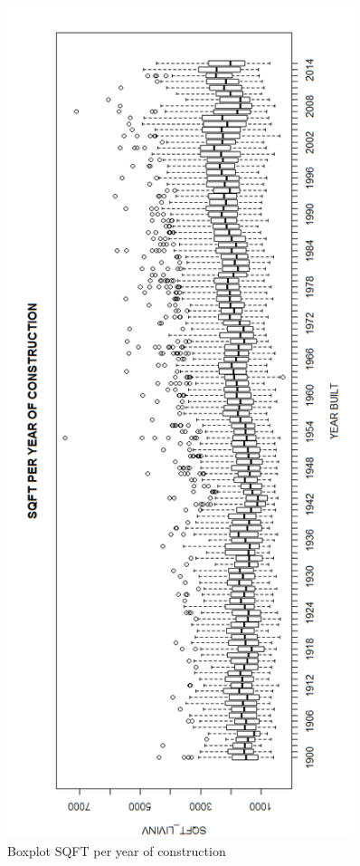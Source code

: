 \begin{figure}[!htb]
        \begin{minipage}{1\textwidth}
                \centering
                \includegraphics[width=0.90\textwidth]{pics/rjdbc5.png}\par\vspace{0cm}
                \caption{Boxplot SQFT per year of construction}
                \label{fig:rjdbc5}
        \end{minipage}
\end{figure}

